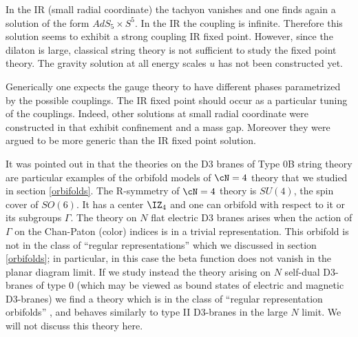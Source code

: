 

In the IR (small radial coordinate) the tachyon vanishes and one finds
again a solution of the form $AdS_5 \times S^5$.  In the IR the
coupling is infinite.  Therefore this solution seems to exhibit a
strong coupling IR fixed point.  However, since the dilaton is large,
classical string theory is not sufficient to study the fixed point
theory.  The gravity solution at all energy scales $u$ has not been
constructed yet.

Generically one expects
the gauge theory to have different phases parametrized by the possible  
couplings.
The IR fixed point should occur as a particular tuning of the 
couplings.
Indeed, other solutions at small radial coordinate were constructed
in \cite{Minahan:1998af} that  exhibit confinement and a mass gap.
Moreover they were argued to be more generic 
than the IR fixed point solution.


It was pointed out in \cite{Nekrasov:1999mn} that the theories on
 the D3 branes
of Type 0B string theory are particular examples of the orbifold models 
of $\cN=4$ theory that we studied in section \ref{orbifolds}.
The R-symmetry of $\cN=4$ theory is $SU(4)$, the spin cover of $SO(6)$.
It has a center $\IZ_4$ and one can orbifold with respect to it or 
its subgroups $\Gamma$.
The theory on $N$ flat electric D3 branes arises when the action
 of $\Gamma$
on the Chan-Paton (color) indices is in a trivial representation.
This orbifold is not in the class of ``regular representations'' which
we discussed in section \ref{orbifolds}; in particular, in this case the
beta function does not vanish in the planar diagram limit. If we study
instead the theory arising on $N$ self-dual D3-branes of type 0 (which may
be viewed as bound states of electric and magnetic D3-branes) we find
a theory which is in the class of 
``regular representation orbifolds'' \cite{Klebanov:1999ch},
and behaves similarly to type II D3-branes in the large $N$ limit. We will
not discuss this theory here.
    
